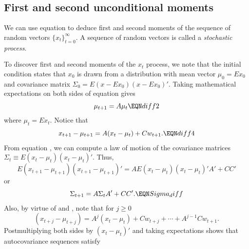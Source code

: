 \subsection{First and second unconditional moments}\label{sec:linearsysmoments}%
We can use equation  to deduce
 first and second moments of the sequence of random vectors
$\{x_t\}_{t=0}^\infty$.  A sequence of random vectors is called a
{\it stochastic process\/}.%

To discover  first and second moments of
the $x_t$ process,
we note that    the initial condition states that   $x_0$ is drawn from a distribution with mean vector $ \mu_0 = E x_0$ and
covariance matrix $\Sigma_0 = E (x- E x_0) (x - E x_0)'$.
Taking mathematical expectations on both sides of equation
 gives
$$ \mu_{t+1} = A \mu_t \EQN diff2 $$
where $\mu_t = E x_t $.
Notice that
$$ x_{t+1} - \mu_{t+1} = A ( x_t - \mu_t) + C w_{t+1}. \EQN diff4 $$
  From equation ,
we can compute a  law of motion of the  covariance matrices
$ \Sigma_t \equiv E(x_t - \mu_t) (x_t - \mu_t)' .$
Thus,
$$ E(x_{t+1} - \mu_{t+1}) (x_{t+1} -\mu_{t+1})' = A E(x_t -\mu_t) (x_t-\mu_t)'A'
  + C C'$$
or
$$ \Sigma_{t+1} = A \Sigma_t A' + C C' .  \EQN Sigma_diff $$
Also,  by virtue of   and , note that for $j \geq 0$
$$ (x_{t+j} - \mu_{t+j}) = A^j (x_t - \mu_t) + C w_{t+j} + \cdots
  +   A^{j-1} C w_{t+1}.  $$
Postmultiplying both sides by $(x_t - \mu_t)'$
and taking expectations shows that
autocovariance sequences satisfy
